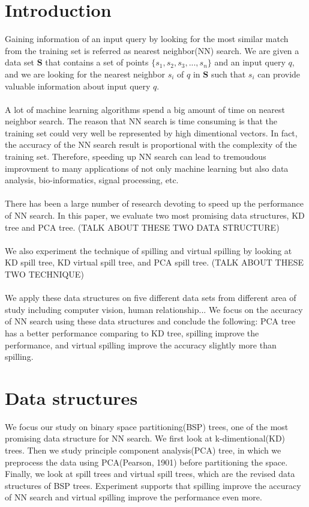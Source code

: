 \documentclass[paper=letter, fontsize=12pt]{article} %
\begin{document}
\section{Introduction}
Gaining information of an input query by looking for the most similar match from the training set is referred as nearest neighbor(NN) search. We are given a data set $\mathbf S$ that contains a set of points $\{ s_1, s_2, s_3, ... , s_n\}$ and an input query $q$, and we are looking for the nearest neighbor $s_i$ of $q$ in $\mathbf S$ such that $s_i$ can provide valuable information about input query $q$.
\\~\\
A lot of machine learning algorithms spend a big amount of time on nearest neighbor search. The reason that NN search is time consuming is that the training set could very well be represented by high dimentional vectors. In fact, the accuracy of the NN search result is proportional with the complexity of the training set. Therefore, speeding up NN search can lead to tremoudous improvment to many applications of not only machine learning but also data analysis, bio-informatics, signal processing, etc.
\\~\\
There has been a large number of research devoting to speed up the performance of NN search. In this paper, we evaluate two most promising data structures, KD tree and PCA tree. (TALK ABOUT THESE TWO DATA STRUCTURE)
\\~\\
We also experiment the technique of spilling and virtual spilling by looking at KD spill tree, KD virtual spill tree, and PCA spill tree. (TALK ABOUT THESE TWO TECHNIQUE)
\\~\\
We apply these data structures on five different data sets from different area of study including computer vision, human relationship... We focus on the accuracy of NN search using these data structures and conclude the following: PCA tree has a better performance comparing to KD tree, spilling improve the performance, and virtual spilling improve the accuracy slightly more than spilling.





\section{Data structures}
We focus our study on binary space partitioning(BSP) trees, one of the most promising data structure for NN search. We first look at k-dimentional(KD) trees. Then we study principle component analysis(PCA) tree, in which we preprocess the data using PCA(Pearson, 1901) before partitioning the space. Finally, we look at spill trees and virtual spill trees, which are the revised data structures of BSP trees. Experiment supports that spilling improve the accuracy of NN search and virtual spilling improve the performance even more.
\end{document}
